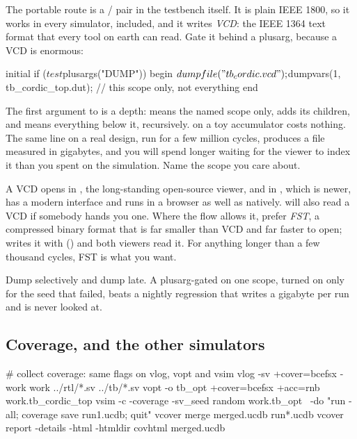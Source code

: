 The portable route is a /
pair in the testbench itself. It is plain IEEE 1800, so it works in every
simulator,  included, and it writes \emph{VCD}: the IEEE 1364
text format that every tool on earth can read. Gate it behind a plusarg,
because a VCD is enormous:

\begin{svcode}
initial if ($test$plusargs("DUMP")) begin
  $dumpfile("tb_cordic.vcd");
  $dumpvars(1, tb_cordic_top.dut);   // this scope only, not everything
end
\end{svcode}

The first argument to  is a depth:  means the named
scope only,  adds its children, and  means everything below it,
recursively.  on a toy accumulator costs
nothing. The same line on a real design, run for a few million cycles, produces
a file measured in gigabytes, and you will spend longer waiting for the viewer
to index it than you spent on the simulation. Name the scope you care about.

A VCD opens in , the long-standing open-source viewer, and in
, which is newer, has a modern interface and runs in a browser as
well as natively.  will also read a VCD if somebody hands you
one. Where the flow allows it, prefer \emph{FST}, a compressed binary format
that is far smaller than VCD and far faster to open;  writes it
with  () and both viewers read it. For
anything longer than a few thousand cycles, FST is what you want.

\begin{ruleofthumb}
Dump selectively and dump late. A plusarg-gated  on one scope,
turned on only for the seed that failed, beats a nightly regression that writes
a gigabyte per run and is never looked at.
\end{ruleofthumb}

\subsection{Coverage, and the other simulators}

\begin{shcode}
# collect coverage: same flags on vlog, vopt and vsim
vlog -sv +cover=bcefsx -work work ../rtl/*.sv ../tb/*.sv
vopt -o tb_opt +cover=bcefsx +acc=rnb work.tb_cordic_top
vsim -c -coverage -sv_seed random work.tb_opt \
     -do "run -all; coverage save run1.ucdb; quit"
vcover merge merged.ucdb run*.ucdb
vcover report -details -html -htmldir covhtml merged.ucdb
\end{shcode}


